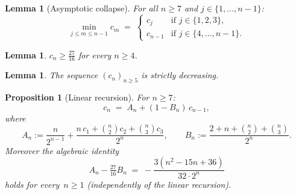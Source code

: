 \documentclass[12pt]{article}
\newtheorem{proposition}[theorem]{Proposition}
\newtheorem{lemma}[theorem]{Lemma}
\theoremstyle{definition}
\theoremstyle{remark}
\begin{document}
\begin{lemma}[Asymptotic collapse]\label{lem:collapse}
  For all $n\ge 7$ and $j\in\{1,\dots,n-1\}$:
  \begin{equation}\label{eq:collapse}
    \min_{j\le m\le n-1}c_m
    \;=\;
    \begin{cases}
      c_j     & \text{if } j\in\{1,2,3\},\\
      c_{n-1} & \text{if } j\in\{4,\dots,n-1\}.
    \end{cases}
  \end{equation}
\end{lemma}

\begin{lemma}\label{lem:lower}
  $c_n\ge\tfrac{27}{16}$ for every $n\ge 4$.
\end{lemma}

\begin{lemma}\label{lem:decreasing}
  The sequence $(c_n)_{n\ge 5}$ is strictly decreasing.
\end{lemma}

\begin{proposition}[Linear recursion]\label{prop:linear}
  For $n\ge 7$:
  \begin{equation}\label{eq:cn-linear}
    c_n \;=\; A_n + (1-B_n)\,c_{n-1},
  \end{equation}
  where
  \begin{equation}\label{eq:AB}
    A_n := \frac{n}{2^{n-1}}
    + \frac{n\,c_1+\binom{n}{2}c_2+\binom{n}{3}c_3}{2^n},
    \qquad
    B_n := \frac{2+n+\binom{n}{2}+\binom{n}{3}}{2^n}.
  \end{equation}
  Moreover the algebraic identity
  \begin{equation}\label{eq:alg-id}
    A_n - \tfrac{27}{16}B_n
    \;=\; -\frac{3(n^2-15n+36)}{32\cdot 2^n}
  \end{equation}
  holds for every~$n\ge 1$ (independently of the linear recursion).
\end{proposition}
\end{document}
